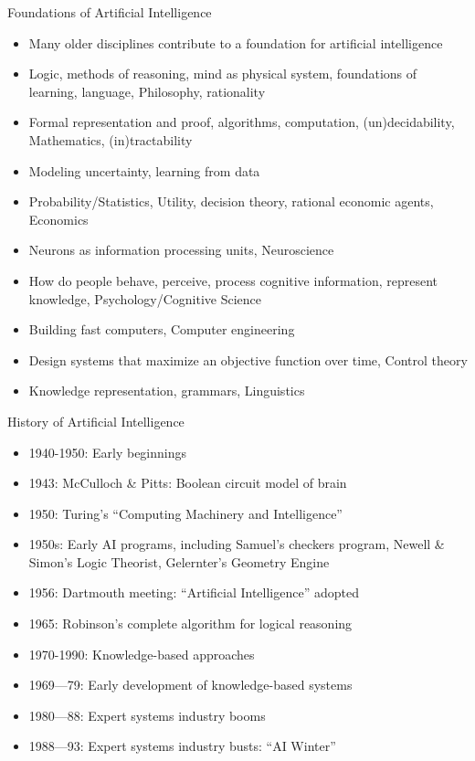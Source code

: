 \documentclass{beamer}
\begin{document}
\begin{frame}{Foundations of Artificial Intelligence}
\begin{itemize}
\item Many older disciplines contribute to a foundation for artificial intelligence
\item Logic, methods of reasoning, mind as physical system, foundations of learning, language, Philosophy, rationality
\item Formal representation and proof, algorithms, computation, (un)decidability, Mathematics, (in)tractability
\item Modeling uncertainty, learning from data
\item Probability/Statistics, Utility, decision theory, rational economic agents, Economics
\item Neurons as information processing units, Neuroscience
\item How do people behave, perceive, process cognitive information, represent knowledge, Psychology/Cognitive Science
\item Building fast computers, Computer engineering
\item Design systems that maximize an objective function over time, Control theory
\item Knowledge representation, grammars, Linguistics
\end{itemize}
\end{frame}

\begin{frame}{History of Artificial Intelligence}
\begin{itemize}
\item 1940-1950: Early beginnings
\item 1943: McCulloch \& Pitts: Boolean circuit model of brain
\item 1950: Turing's “Computing Machinery and Intelligence”
\item 1950s: Early AI programs, including Samuel's checkers program, Newell \& Simon's Logic Theorist, Gelernter's Geometry Engine
\item 1956: Dartmouth meeting: “Artificial Intelligence” adopted
\item 1965: Robinson's complete algorithm for logical reasoning
\item 1970-1990: Knowledge-based approaches
\item 1969—79: Early development of knowledge-based systems
\item 1980—88: Expert systems industry booms
\item 1988—93: Expert systems industry busts: “AI Winter”
\end{itemize}
\end{frame}
\end{document}
